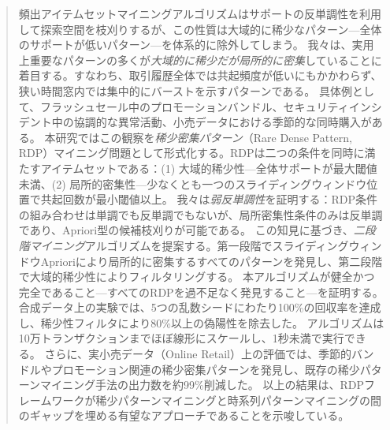 \begin{abstract}
頻出アイテムセットマイニングアルゴリズムはサポートの反単調性を利用して探索空間を枝刈りするが、この性質は大域的に稀少なパターン---全体のサポートが低いパターン---を体系的に除外してしまう。
我々は、実用上重要なパターンの多くが\emph{大域的に稀少だが局所的に密集}していることに着目する。すなわち、取引履歴全体では共起頻度が低いにもかかわらず、狭い時間窓内では集中的にバーストを示すパターンである。
具体例として、フラッシュセール中のプロモーションバンドル、セキュリティインシデント中の協調的な異常活動、小売データにおける季節的な同時購入がある。
本研究ではこの観察を\emph{稀少密集パターン}（Rare Dense Pattern, RDP）マイニング問題として形式化する。RDPは二つの条件を同時に満たすアイテムセットである：(1) 大域的稀少性---全体サポートが最大閾値未満、(2) 局所的密集性---少なくとも一つのスライディングウィンドウ位置で共起回数が最小閾値以上。
我々は\emph{弱反単調性}を証明する：RDP条件の組み合わせは単調でも反単調でもないが、局所密集性条件のみは反単調であり、Apriori型の候補枝刈りが可能である。
この知見に基づき、\emph{二段階マイニング}アルゴリズムを提案する。第一段階でスライディングウィンドウAprioriにより局所的に密集するすべてのパターンを発見し、第二段階で大域的稀少性によりフィルタリングする。
本アルゴリズムが健全かつ完全であること---すべてのRDPを過不足なく発見すること---を証明する。
合成データ上の実験では、5つの乱数シードにわたり100\%の回収率を達成し、稀少性フィルタにより80\%以上の偽陽性を除去した。
アルゴリズムは10万トランザクションまでほぼ線形にスケールし、1秒未満で実行できる。
さらに、実小売データ（Online Retail）上の評価では、季節的バンドルやプロモーション関連の稀少密集パターンを発見し、既存の稀少パターンマイニング手法の出力数を約99\%削減した。
以上の結果は、RDPフレームワークが稀少パターンマイニングと時系列パターンマイニングの間のギャップを埋める有望なアプローチであることを示唆している。
\end{abstract}
